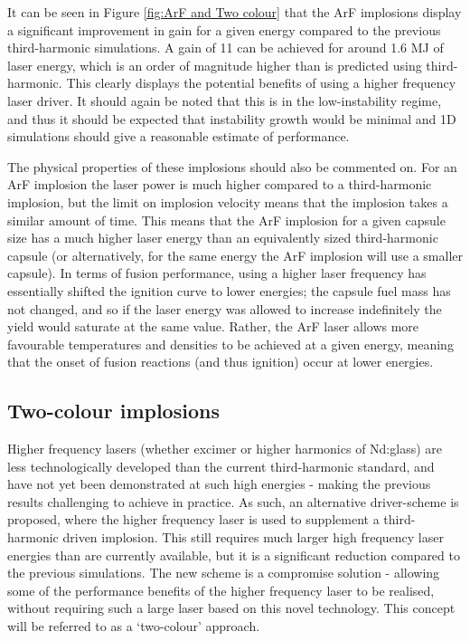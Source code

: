 It can be seen in Figure \ref{fig:ArF and Two colour} that the ArF implosions display a significant improvement in gain for a given energy compared to the previous third-harmonic simulations. A gain of 11 can be achieved for around 1.6 MJ of laser energy, which is an order of magnitude higher than is predicted using third-harmonic. This clearly displays the potential benefits of using a higher frequency laser driver. It should again be noted that this is in the low-instability regime, and thus it should be expected that instability growth would be minimal and 1D simulations should give a reasonable estimate of performance.

The physical properties of these implosions should also be commented on. For an ArF implosion the laser power is much higher compared to a third-harmonic implosion, but the limit on implosion velocity means that the implosion takes a similar amount of time. This means that the ArF implosion for a given capsule size has a much higher laser energy than an equivalently sized third-harmonic capsule (or alternatively, for the same energy the ArF implosion will use a smaller capsule). In terms of fusion performance, using a higher laser frequency has essentially shifted the ignition curve to lower energies; the capsule fuel mass has not changed, and so if the laser energy was allowed to increase indefinitely the yield would saturate at the same value. Rather, the ArF laser allows more favourable temperatures and densities to be achieved at a given energy, meaning that the onset of fusion reactions (and thus ignition) occur at lower energies. 

\subsection{Two-colour implosions}

Higher frequency lasers (whether excimer or higher harmonics of Nd:glass) are less technologically developed than the current third-harmonic standard, and have not yet been demonstrated at such high energies - making the previous results challenging to achieve in practice. As such, an alternative driver-scheme is proposed, where the higher frequency laser is used to supplement a third-harmonic driven implosion. This still requires much larger high frequency laser energies than are currently available, but it is a significant reduction compared to the previous simulations. The new scheme is a compromise solution - allowing some of the performance benefits of the higher frequency laser to be realised, without requiring such a large laser based on this novel technology. This concept will be referred to as a `two-colour' approach.

